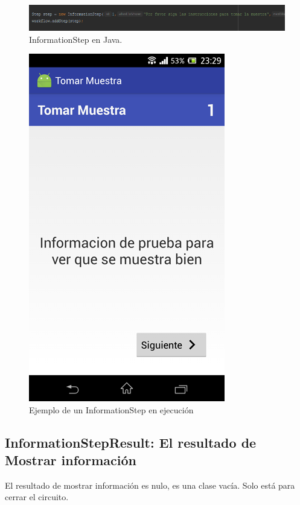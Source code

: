 \begin{figure}[H]
  \centering
    \includegraphics[scale=0.6]{50-anexos/C-steps/information_java.png} 
    \caption{InformationStep en Java.}
\end{figure}

\begin{figure}[H]
  \centering
    \includegraphics[scale=0.4]{05-implementacion/InformationStep.png} 
   \caption{Ejemplo de un InformationStep en ejecución}
   \label{fig:imgInformationStep}
\end{figure}


\subsection{InformationStepResult: El resultado de Mostrar información}
El resultado de mostrar información es nulo, es una clase vacía. Solo está para cerrar el circuito.





